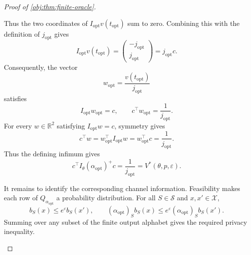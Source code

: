 \documentclass[11pt]{article}
\begin{document}
\begin{proof}[Proof of \cref{obj:thm:finite-oracle}]
\begin{enumerate}
Thus the two coordinates of
\(I_{\mathrm{opt}}v(t_{\mathrm{opt}})\) sum to zero. Combining this
with the definition of \(j_{\mathrm{opt}}\) gives
\[
I_{\mathrm{opt}}v(t_{\mathrm{opt}})
=
\begin{pmatrix}-j_{\mathrm{opt}}\\j_{\mathrm{opt}}\end{pmatrix}
=j_{\mathrm{opt}}c.
\]
Consequently, the vector
\[
w_{\mathrm{opt}}
=\frac{v(t_{\mathrm{opt}})}{j_{\mathrm{opt}}}
\]
satisfies
\[
I_{\mathrm{opt}}w_{\mathrm{opt}}=c,
\qquad
c^\top w_{\mathrm{opt}}=\frac1{j_{\mathrm{opt}}}.
\]
For every \(w\in\mathbb R^2\) satisfying \(I_{\mathrm{opt}}w=c\),
symmetry gives
\[
c^\top w
=w_{\mathrm{opt}}^\top I_{\mathrm{opt}}w
=w_{\mathrm{opt}}^\top c
=\frac1{j_{\mathrm{opt}}}.
\]
Thus the defining infimum gives
\[
c^\top I_\theta(\alpha_{\mathrm{opt}})^+c
=
\frac1{j_{\mathrm{opt}}}
=
V^*(\theta,p,\varepsilon).
\]

It remains to identify the corresponding channel information.
Feasibility makes each row of \(Q_{\alpha_{\mathrm{opt}}}\) a
probability distribution. For all \(S\in\mathcal S\) and
\(x,x'\in\mathcal X\),
\[
b_S(x)\le e^\varepsilon b_S(x'),
\qquad
(\alpha_{\mathrm{opt}})_Sb_S(x)
\le
e^\varepsilon(\alpha_{\mathrm{opt}})_Sb_S(x').
\]
Summing over any subset of the finite output alphabet gives the
required privacy inequality.


\end{enumerate}
\end{proof}
\end{document}
